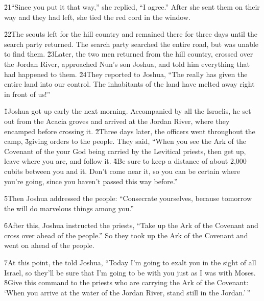 \v{21}``Since you put it that way,'' she replied, ``I agree.'' After she sent them on their way and they had left, she tied the red cord in the window.

\v{22}The scouts left for the hill country and remained there for three days until the search party returned. The search party searched the entire road, but was unable to find them. \v{23}Later, the two men returned from the hill country, crossed over the Jordan River, approached Nun's son Joshua, and told him everything that had happened to them. \v{24}They reported to Joshua, ``The  really has given the entire land into our control. The inhabitants of the land have melted away right in front of us!''

\v{1}Joshua got up early the next morning. Accompanied by all the Israelis, he set out from the Acacia groves and arrived at the Jordan River, where they encamped before crossing it. \v{2}Three days later, the officers went throughout the camp, \v{3}giving orders to the people. They said, ``When you see the Ark of the Covenant of the  your God being carried by the Levitical priests, then get up, leave where you are, and follow it. \v{4}Be sure to keep a distance of about 2,000 cubits between you and it. Don't come near it, so you can be certain where you're going, since you haven't passed this way before.''

\v{5}Then Joshua addressed the people: ``Consecrate yourselves, because tomorrow the  will do marvelous things among you.''

\v{6}After this, Joshua instructed the priests, ``Take up the Ark of the Covenant and cross over ahead of the people.'' So they took up the Ark of the Covenant and went on ahead of the people.

\v{7}At this point, the  told Joshua, ``Today I'm going to exalt you in the sight of all Israel, so they'll be sure that I'm going to be with you just as I was with Moses. \v{8}Give this command to the priests who are carrying the Ark of the Covenant: `When you arrive at the water of the Jordan River, stand still in the Jordan.'\,''

